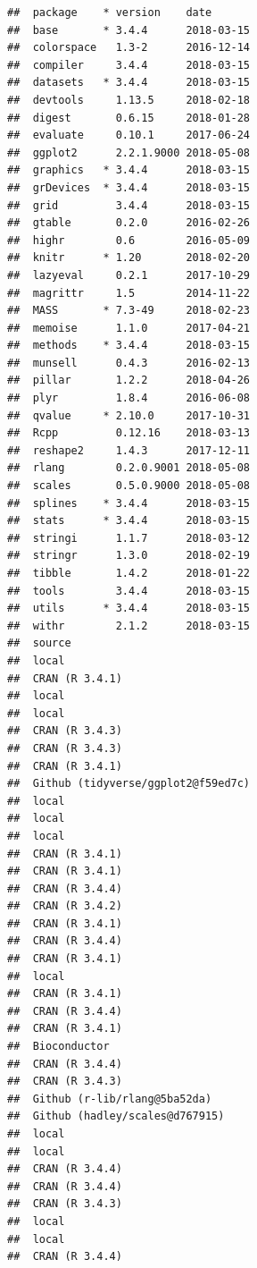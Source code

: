 \documentclass{article}\usepackage[]{graphicx}\usepackage[]{color}
\makeatletter
\newenvironment{kframe}{%
 \def\at@end@of@kframe{}%
 \ifinner\ifhmode%
  \def\at@end@of@kframe{\end{minipage}}%
  \begin{minipage}{\columnwidth}%
 \fi\fi%
 \def\FrameCommand##1{\hskip\@totalleftmargin \hskip-\fboxsep
 \colorbox{shadecolor}{##1}\hskip-\fboxsep
     \hskip-\linewidth \hskip-\@totalleftmargin \hskip\columnwidth}%
 \MakeFramed {\advance\hsize-\width
   \@totalleftmargin\z@ \linewidth\hsize
   \@setminipage}}%
 {\par\unskip\endMakeFramed%
 \at@end@of@kframe}
\newenvironment{knitrout}{}{} %
\makeatother
\begin{document}
\begin{knitrout}
\begin{kframe}
{\ttfamily\noindent\itshape\color{messagecolor}{\#\# Packages --------------------------------------------------}}\begin{verbatim}
##  package    * version    date      
##  base       * 3.4.4      2018-03-15
##  colorspace   1.3-2      2016-12-14
##  compiler     3.4.4      2018-03-15
##  datasets   * 3.4.4      2018-03-15
##  devtools     1.13.5     2018-02-18
##  digest       0.6.15     2018-01-28
##  evaluate     0.10.1     2017-06-24
##  ggplot2      2.2.1.9000 2018-05-08
##  graphics   * 3.4.4      2018-03-15
##  grDevices  * 3.4.4      2018-03-15
##  grid         3.4.4      2018-03-15
##  gtable       0.2.0      2016-02-26
##  highr        0.6        2016-05-09
##  knitr      * 1.20       2018-02-20
##  lazyeval     0.2.1      2017-10-29
##  magrittr     1.5        2014-11-22
##  MASS       * 7.3-49     2018-02-23
##  memoise      1.1.0      2017-04-21
##  methods    * 3.4.4      2018-03-15
##  munsell      0.4.3      2016-02-13
##  pillar       1.2.2      2018-04-26
##  plyr         1.8.4      2016-06-08
##  qvalue     * 2.10.0     2017-10-31
##  Rcpp         0.12.16    2018-03-13
##  reshape2     1.4.3      2017-12-11
##  rlang        0.2.0.9001 2018-05-08
##  scales       0.5.0.9000 2018-05-08
##  splines    * 3.4.4      2018-03-15
##  stats      * 3.4.4      2018-03-15
##  stringi      1.1.7      2018-03-12
##  stringr      1.3.0      2018-02-19
##  tibble       1.4.2      2018-01-22
##  tools        3.4.4      2018-03-15
##  utils      * 3.4.4      2018-03-15
##  withr        2.1.2      2018-03-15
##  source                            
##  local                             
##  CRAN (R 3.4.1)                    
##  local                             
##  local                             
##  CRAN (R 3.4.3)                    
##  CRAN (R 3.4.3)                    
##  CRAN (R 3.4.1)                    
##  Github (tidyverse/ggplot2@f59ed7c)
##  local                             
##  local                             
##  local                             
##  CRAN (R 3.4.1)                    
##  CRAN (R 3.4.1)                    
##  CRAN (R 3.4.4)                    
##  CRAN (R 3.4.2)                    
##  CRAN (R 3.4.1)                    
##  CRAN (R 3.4.4)                    
##  CRAN (R 3.4.1)                    
##  local                             
##  CRAN (R 3.4.1)                    
##  CRAN (R 3.4.4)                    
##  CRAN (R 3.4.1)                    
##  Bioconductor                      
##  CRAN (R 3.4.4)                    
##  CRAN (R 3.4.3)                    
##  Github (r-lib/rlang@5ba52da)      
##  Github (hadley/scales@d767915)    
##  local                             
##  local                             
##  CRAN (R 3.4.4)                    
##  CRAN (R 3.4.4)                    
##  CRAN (R 3.4.3)                    
##  local                             
##  local                             
##  CRAN (R 3.4.4)
\end{verbatim}
\end{kframe}
\end{knitrout}
\end{document}
